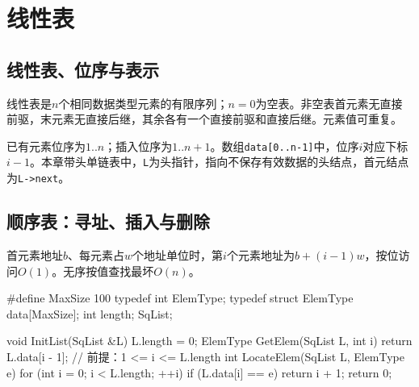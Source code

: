 \chapter{线性表}\label{DS02}

\section{线性表、位序与表示}\label{DS02-definition}

线性表是\(n\)个相同数据类型元素的有限序列；\(n=0\)为空表。非空表首元素无直接前驱，末元素无直接后继，其余各有一个直接前驱和直接后继。元素值可重复。

已有元素位序为\(1..n\)；插入位序为\(1..n+1\)。数组\texttt{data[\allowbreak{}0.\allowbreak{}.\allowbreak{}n-1]\allowbreak{}}中，位序\(i\)对应下标\(i-1\)。本章带头单链表中，\texttt{L}为头指针，指向不保存有效数据的头结点，首元结点为\texttt{L->\allowbreak{}next}。

\section{顺序表：寻址、插入与删除}\label{DS02-sequence}

首元素地址\(b\)、每元素占\(w\)个地址单位时，第\(i\)个元素地址为\(b+(i-1)w\)，按位访问\(O(1)\)。无序按值查找最坏\(O(n)\)。

\par\smallskip\noindent\begin{minipage}{\linewidth}
\begin{codeblock}[language={C++}]
#define MaxSize 100
typedef int ElemType;
typedef struct {
    ElemType data[MaxSize];
    int length;
} SqList;
\end{codeblock}
\end{minipage}\par\smallskip

\par\smallskip\noindent\begin{minipage}{\linewidth}
\begin{codeblock}[language={C++}]
void InitList(SqList &L) { L.length = 0; }
ElemType GetElem(SqList L, int i) {
    return L.data[i - 1];  // 前提：1 <= i <= L.length
}
int LocateElem(SqList L, ElemType e) {
    for (int i = 0; i < L.length; ++i)
        if (L.data[i] == e) return i + 1;
    return 0;
}
\end{codeblock}
\end{minipage}\par\smallskip

